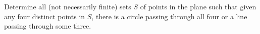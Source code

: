 Determine all (not necessarily finite) sets $S$ of points in the plane such that given any four distinct points in $S$, there is a circle passing through all four or a line passing through some three.